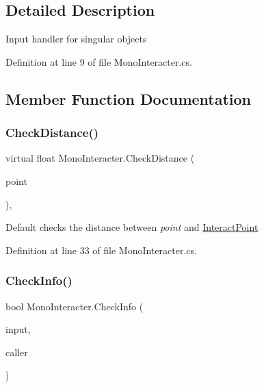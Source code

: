 \subsection{Detailed Description}
Input handler for singular objects 



Definition at line 9 of file Mono\+Interacter.\+cs.



\subsection{Member Function Documentation}
\mbox{\label{class_mono_interacter_a3d36c682922d670329f90e5573e67c45}} 
\subsubsection{\texorpdfstring{Check\+Distance()}{CheckDistance()}}
{\footnotesize\ttfamily virtual float Mono\+Interacter.\+Check\+Distance (\begin{DoxyParamCaption}\item[{Vector3}]{point }\end{DoxyParamCaption})\hspace{0.3cm}{\ttfamily [protected]}, {\ttfamily [virtual]}}



Default checks the distance between {\itshape point}  and \mbox{\hyperlink{class_mono_interacter_a311fa1a8d88a508851977760b6db955e}{Interact\+Point}} 



Definition at line 33 of file Mono\+Interacter.\+cs.

\mbox{\label{class_mono_interacter_ac79722c1e38867f96166dbae403f0110}} 
\subsubsection{\texorpdfstring{Check\+Info()}{CheckInfo()}}
{\footnotesize\ttfamily bool Mono\+Interacter.\+Check\+Info (\begin{DoxyParamCaption}\item[{Input\+Control}]{input,  }\item[{\mbox{\hyperlink{class_animal}{Animal}}}]{caller }\end{DoxyParamCaption})}



